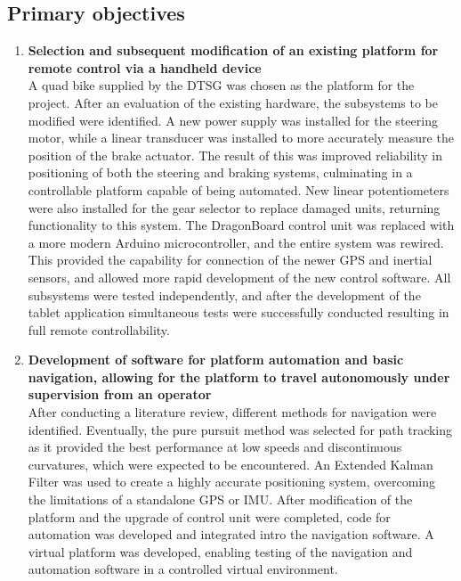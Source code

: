 \documentclass[main.tex]{subfiles}
\begin{document}
\subsection{Primary objectives}
\begin{enumerate}
\item \textbf{Selection and subsequent modification of an existing platform for remote control via a handheld device}\\ 
A quad bike supplied by the DTSG was chosen as the platform for the project. 
After an evaluation of the existing hardware, the subsystems to be modified were identified. 
A new power supply was installed for the steering motor, while a linear transducer was installed to more accurately measure the position of the brake actuator. 
The result of this was improved reliability in positioning of both the steering and braking systems, culminating in a controllable platform capable of being automated.
New linear potentiometers were also installed for the gear selector to replace damaged units, returning functionality to this system. 
The DragonBoard control unit was replaced with a more modern Arduino microcontroller, and the entire system was rewired. 
This provided the capability for connection of the newer GPS and inertial sensors, and allowed more rapid development of the new control software.
All subsystems were tested independently, and after the development of the tablet application simultaneous tests were successfully conducted resulting in full remote controllability.

 

\item \textbf{Development of software for platform automation and basic navigation, allowing for the platform to travel autonomously under supervision from an operator}\\ 
After conducting a literature review, different methods for navigation were identified. Eventually, the pure pursuit method was selected for path tracking as it provided the best performance at low speeds and discontinuous curvatures, which were expected to be encountered. An Extended Kalman Filter was used to create a highly accurate positioning system, overcoming the limitations of a standalone GPS or IMU. After modification of the platform and the upgrade of control unit were completed, code for automation was developed and integrated intro the navigation software. A virtual platform was developed, enabling testing of the navigation and automation software in a controlled virtual environment. 


\end{enumerate}
\end{document}
